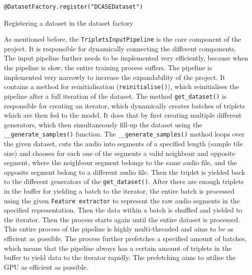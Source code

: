 \begin{code}[htbp]
\begin{verbatim}
@DatasetFactory.register("DCASEDataset")
\end{verbatim}
\caption{Registering a dataset in the dataset factory}
\label{code:Dataset-Factory}
\end{code}
\noindent
As mentioned before, the \texttt{TripletsInputPipeline} is the core component of the project. It is responsible for dynamically connecting the different components. The input pipeline further needs to be implemented very efficiently, because when the pipeline is slow, the entire training process suffers. The pipeline is implemented very narrowly to increase the expandability of the project. It contains a method for reinitialisation (\texttt{reinitialise()}), which reinitialises the pipeline after a full iteration of the dataset.
\newline
\newline
The method \texttt{get\_dataset()} is responsible for creating an iterator, which dynamically creates batches of triplets which are then fed to the model. It does that by first creating multiple different generators, which then simultaneously fill-up the dataset using the \texttt{\_\_generate\_samples()} function. The \texttt{\_\_generate\_samples()} method loops over the given dataset, cuts the audio into segments of a specified length (sample tile size) and chooses for each one of the segments a valid neighbour and opposite segment, where the neighbour segment belongs to the same audio file, and the opposite segment belong to a different audio file. Then the triplet is yielded back to the different generators of the \texttt{get\_dataset()}. After there are enough triplets in the buffer for yielding a batch to the iterator, the entire batch is processed using the given \texttt{Feature extractor} to represent the raw audio segments in the specified representation. Then the data within a batch is shuffled and yielded to the iterator. Then the process starts again until the entire dataset is processed. 
\newline
\newline
This entire process of the pipeline is highly multi-threaded and aims to be as efficient as possible. The process further prefetches a specified amount of batches, which means that the pipeline always has a certain amount of triplets in the buffer to yield data to the iterator rapidly. The prefetching aims to utilise the \gls{GPU} as efficient as possible.

